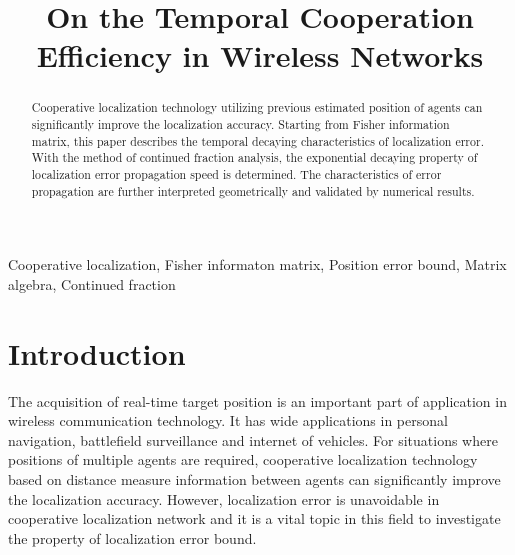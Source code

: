\documentclass[conference]{IEEEtran}
\begin{document}
\title{On the Temporal Cooperation Efficiency in Wireless Networks}
\author{
}
\maketitle
\begin{abstract}
Cooperative localization technology utilizing previous estimated position of agents can significantly improve the localization accuracy.
Starting from Fisher information matrix, this paper describes the temporal decaying characteristics of localization error. 
With the method of continued fraction analysis, the exponential decaying property of localization error propagation speed is determined.
The characteristics of error propagation are further interpreted geometrically and validated by numerical results. 
\end{abstract}
\begin{IEEEkeywords}
Cooperative localization, Fisher informaton matrix, Position error bound, Matrix algebra, Continued fraction
\end{IEEEkeywords}
\maketitle



\section{Introduction}
The acquisition of real-time target position is an important part of application in wireless communication technology. 
It has wide applications in personal navigation, battlefield surveillance and internet of vehicles\cite{Win2011Network}. 
For situations where positions of multiple agents are required, 
cooperative localization technology based on distance measure information between agents can significantly improve the localization accuracy. 
However, localization error is unavoidable in cooperative localization network 
and it is a vital topic in this field to investigate the property of localization error bound.
\end{document}
